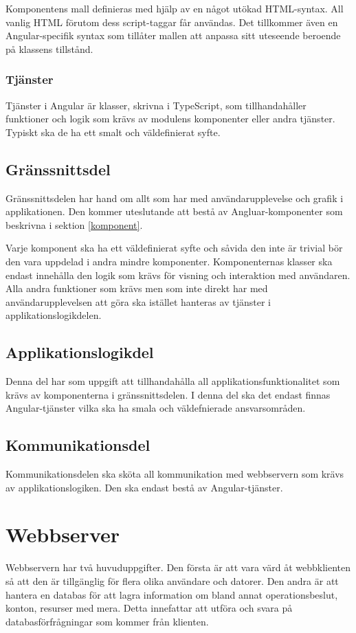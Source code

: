 \documentclass[a4paper,10pt]{article}
\begin{document}
Komponentens mall definieras med hjälp av en något utökad HTML-syntax. All vanlig HTML förutom dess script-taggar får användas. Det tillkommer även en Angular-specifik syntax som tillåter mallen att anpassa sitt uteseende beroende på klassens tillstånd.
\subsubsection{Tjänster}
Tjänster i Angular är klasser, skrivna i TypeScript, som tillhandahåller funktioner och logik som krävs av modulens komponenter eller andra tjänster. Typiskt ska de ha ett smalt och väldefinierat syfte.

\subsection{Gränssnittsdel}
Gränssnittsdelen har hand om allt som har med användarupplevelse och grafik i applikationen. Den kommer uteslutande att bestå av Angluar-komponenter som beskrivna i sektion \ref{komponent}.

Varje komponent ska ha ett väldefinierat syfte och såvida den inte är trivial bör den vara uppdelad i andra mindre komponenter. Komponenternas klasser ska endast innehålla den logik som krävs för visning och interaktion med användaren. Alla andra funktioner som krävs men som inte direkt har med användarupplevelsen att göra ska istället hanteras av tjänster i applikationslogikdelen.

\subsection{Applikationslogikdel}
Denna del har som uppgift att tillhandahålla all applikationsfunktionalitet som krävs av komponenterna i gränssnittsdelen. I denna del ska det endast finnas Angular-tjänster vilka ska ha smala och väldefnierade ansvarsområden.

\subsection{Kommunikationsdel}
Kommunikationsdelen ska sköta all kommunikation med webbservern som krävs av applikationslogiken. Den ska endast bestå av Angular-tjänster.

\section{Webbserver}
Webbservern har två huvuduppgifter. Den första är att vara värd åt webbklienten så att den är tillgänglig för flera olika användare och datorer. Den andra är att hantera en databas för att lagra information om bland annat operationsbeslut, konton, resurser med mera. Detta innefattar att utföra och svara på databasförfrågningar som kommer från klienten.
\end{document}
